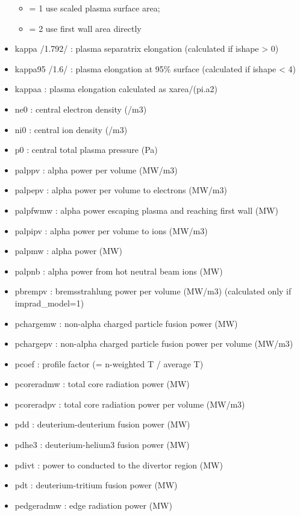 \documentclass[]{article}
\providecommand{\tightlist}{%
  \setlength{\itemsep}{0pt}\setlength{\parskip}{0pt}}
\begin{document}
\begin{itemize}
  \begin{itemize}
  \tightlist
  \item
    = 1 use scaled plasma surface area;
  \item
    = 2 use first wall area directly
  \end{itemize}
\item
  kappa /1.792/ : plasma separatrix elongation (calculated if ishape
  \textgreater{} 0)
\item
  kappa95 /1.6/ : plasma elongation at 95\% surface (calculated if
  ishape \textless{} 4)
\item
  kappaa : plasma elongation calculated as xarea/(pi.a2)
\item
  ne0 : central electron density (/m3)
\item
  ni0 : central ion density (/m3)
\item
  p0 : central total plasma pressure (Pa)
\item
  palppv : alpha power per volume (MW/m3)
\item
  palpepv : alpha power per volume to electrons (MW/m3)
\item
  palpfwmw : alpha power escaping plasma and reaching first wall (MW)
\item
  palpipv : alpha power per volume to ions (MW/m3)
\item
  palpmw : alpha power (MW)
\item
  palpnb : alpha power from hot neutral beam ions (MW)
\item
  pbrempv : bremsstrahlung power per volume (MW/m3) (calculated only if
  imprad\_model=1)
\item
  pchargemw : non-alpha charged particle fusion power (MW)
\item
  pchargepv : non-alpha charged particle fusion power per volume (MW/m3)
\item
  pcoef : profile factor (= n-weighted T / average T)
\item
  pcoreradmw : total core radiation power (MW)
\item
  pcoreradpv : total core radiation power per volume (MW/m3)
\item
  pdd : deuterium-deuterium fusion power (MW)
\item
  pdhe3 : deuterium-helium3 fusion power (MW)
\item
  pdivt : power to conducted to the divertor region (MW)
\item
  pdt : deuterium-tritium fusion power (MW)
\item
  pedgeradmw : edge radiation power (MW)

\end{itemize}
\end{document}
